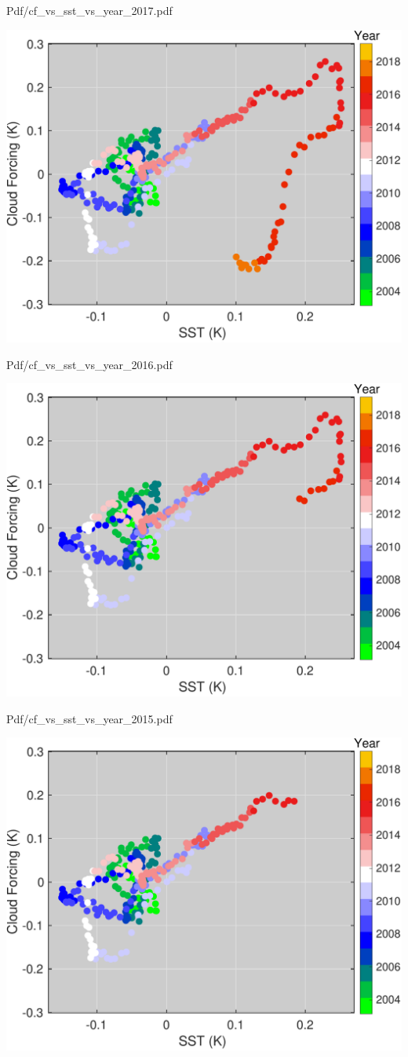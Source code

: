\documentclass[presentation]{beamer}
\begin{document}
\begin{frame}[label={sec:org2f8728f}]{Pdf/cf\_vs\_sst\_vs\_year\_2017.pdf}
\begin{center}
\includegraphics[width=0.7\linewidth]{./Figs/Pdf/cf_vs_sst_vs_year_2017.pdf}
\end{center}
\end{frame}

\begin{frame}[label={sec:orga44157b}]{Pdf/cf\_vs\_sst\_vs\_year\_2016.pdf}
\begin{center}
\includegraphics[width=0.7\linewidth]{./Figs/Pdf/cf_vs_sst_vs_year_2016.pdf}
\end{center}
\end{frame}

\begin{frame}[label={sec:org3e4e3b1}]{Pdf/cf\_vs\_sst\_vs\_year\_2015.pdf}
\begin{center}
\includegraphics[width=0.7\linewidth]{./Figs/Pdf/cf_vs_sst_vs_year_2015.pdf}
\end{center}
\end{frame}
\end{document}
